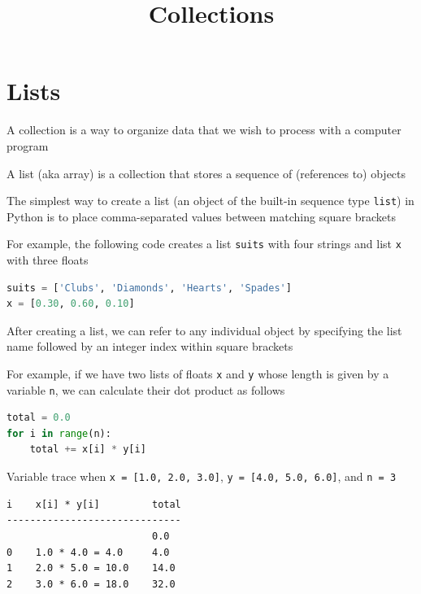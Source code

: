 \documentclass[8pt,a4paper,compress]{beamer}
\title{Collections}
\date{}
\begin{document}
\begin{frame}
\vfill
\titlepage
\end{frame}

\section{Lists}
\begin{frame}[fragile]
\pause

A collection is a way to organize data that we wish to process with a computer program

\pause\bigskip

A list (aka array) is a collection that stores a sequence of (references to) objects

\pause\bigskip

The simplest way to create a list (an object of the built-in sequence type \lstinline{list}) in Python is to place comma-separated values between matching square brackets

\pause\bigskip

For example, the following code creates a list \lstinline{suits} with four strings and list \lstinline{x} with three floats

\smallskip

\begin{lstlisting}[language=Python,style=focusin]
suits = ['Clubs', 'Diamonds', 'Hearts', 'Spades']
x = [0.30, 0.60, 0.10]
\end{lstlisting}

\pause\bigskip

After creating a list, we can refer to any individual object by specifying the list name followed by an integer index within square brackets

\pause\bigskip

For example, if we have two lists of floats \lstinline{x} and \lstinline{y} whose length is given by a variable \lstinline{n}, we can calculate their dot product as follows

\smallskip

\begin{lstlisting}[language=Python,style=focusin]
total = 0.0
for i in range(n):
    total += x[i] * y[i]
\end{lstlisting}

\pause\smallskip

Variable trace when \lstinline{x = [1.0, 2.0, 3.0]}, \lstinline{y = [4.0, 5.0, 6.0]}, and \lstinline{n = 3}

\smallskip

\begin{lstlisting}[language={},style=focusin]
i    x[i] * y[i]         total
------------------------------
                         0.0
0    1.0 * 4.0 = 4.0     4.0
1    2.0 * 5.0 = 10.0    14.0
2    3.0 * 6.0 = 18.0    32.0
\end{lstlisting} 
\end{frame}
\end{document}
